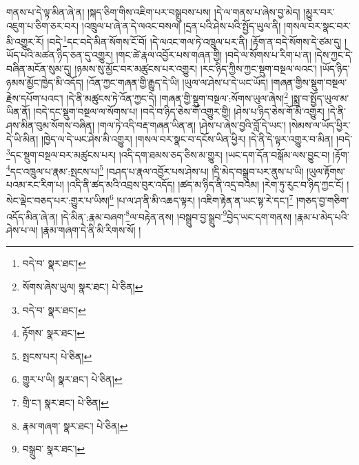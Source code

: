 གནས་པ་དེ་ལྟ་མིན་ཞེ་ན། །སྐད་ཅིག་གིས་འཇིག་པར་བསྒྲུབས་པས། །དེ་ལ་གནས་པ་ཞེས་བྱ་མེད། །མྱུར་བར་འཇུག་པ་ཅིག་ཅར་བར། །འཁྲུལ་པ་ཞེ་ན་དེ་ལའང་བསལ། །དྲན་པའི་ཤེས་པའི་སྤྱོད་ཡུལ་ནི། །གསལ་བར་སྣང་བར་མི་འགྱུར་རོ། །བདེ་\footnote{བདེ་བ་  སྣར་ཐང་། }དང་བདེ་མིན་སོགས་ངོ་བོ། །དེ་ལའང་གལ་ཏེ་འཁྲུལ་པར་ནི། །རྟོག་ན་བདེ་སོགས་དེ་ཙམ་དུ། །ཡོད་པའི་མཚན་ཉིད་ཅན་དུ་འགྱུར། །གང་ཚེ་རྣལ་འབྱོར་པས་གཞན་གྱི། །བདེ་ལ་སོགས་པ་རིག་པ་ན། །དེས་ཀྱང་དེ་བཞིན་མངོན་སུམ་དུ། །ཉམས་སུ་མྱོང་བར་མཚུངས་པར་འགྱུར། །རང་ཉིད་ཀྱིས་ཀྱང་སྡུག་བསྔལ་ལའང་། །ཡོད་ཉིད་ཉམས་མྱོང་ཁྱེད་མི་འདོད། །འོན་ཀྱང་གཞན་གྱི་རྒྱུད་དེ་ཡི། །ཡུལ་ལ་ཤེས་པ་དེ་ཡང་ཡོད། །གཞན་གྱིས་སྡུག་བསྔལ་རྗེས་དཔོག་པའང་། །དེ་ནི་མཚུངས་ཏེ་འོན་ཀྱང་དེ། །གཞན་གྱི་སྡུག་བསྔལ་:སོགས་ཡུལ་ཞེས།\footnote{སོགས་ཞེས་ཡུལ།  སྣར་ཐང་།  པེ་ཅིན། } །སྨྲ་བ་སྤྱོད་ཡུལ་མ་ཡིན་ནོ། །བདེ་དང་སྡུག་བསྔལ་ལ་སོགས་པ། །བདེ་བ་ཉིད་ཅེས་གོ་འགྱུར་གྱི། །ཤེས་པ་ཉིད་ཅེས་གོ་མི་འགྱུར། །དེ་ནི་ཤས་མིན་བུམ་སོགས་བཞིན། །གལ་ཏེ་འདི་བརྡ་གཞན་ཡིན་ན། །ཤེས་པ་ཞེས་བྱའི་བློ་དེ་ཡང་། །སེམས་ལ་ཡོད་ཕྱིར་དེ་ཡི་མིན། །ཁྱེད་ལ་དེ་ཡང་ཤེས་མི་འགྱུར། །གསལ་བར་སྣང་བ་དངོས་ཡིན་ཕྱིར། །དེ་ནི་དེ་ལྟར་འགྱུར་བ་མིན། །བདེ་\footnote{བདེ་བ་  སྣར་ཐང་། }དང་སྡུག་བསྔལ་བར་མཚུངས་པར། །འདི་དག་ཐམས་ཅད་ཅིས་མ་གྱུར། །ཡང་དག་དོན་བསྒོམ་ལས་བྱུང་བ། །རྟོག་\footnote{རྟོགས་  སྣར་ཐང་། }དང་འཁྲུལ་པ་རྣམ་:སྤངས་པ།\footnote{སྤངས་པར།  པེ་ཅིན། } །བཤད་པ་རྣལ་འབྱོར་པས་ཤེས་པ། །དྲི་མེད་བསྒྲུབ་པར་ནུས་པ་ཡི། །ཡུལ་རྟོགས་པའམ་རང་རིག་པ། །འདི་ནི་ཚད་མའི་འབྲས་བུར་འདོད། །ཚད་མ་ཉིད་ནི་འདྲ་བའམ། །རེག་ཏུ་རུང་བ་ཉིད་ཀྱང་ངོ། །སེང་ལྡེང་བཅད་པར་:གྱུར་པ་ཡིས།\footnote{གྱུར་པ་ཡི།  སྣར་ཐང་།  པེ་ཅིན། } །པ་ལ་ཤ་ནི་མི་འཆད་ལྟར། །འཇིག་རྟེན་ན་ཡང་སྟ་རེ་དང་།\footnote{གྲི་ང་།  སྣར་ཐང་།  པེ་ཅིན། } །གཅད་བྱ་གཅིག་འདོད་མིན་ཞེ་ན། །དེ་མིན་:རྣམ་བཞག་\footnote{རྣམ་གཞག་  སྣར་ཐང་།  པེ་ཅིན། }ལ་བརྟེན་ནས། །བསྒྲུབ་བྱ་སྒྲུབ་\footnote{བསྒྲུབ་  སྣར་ཐང་། }བྱེད་ཡང་དག་གནས། །རྣམ་པ་མེད་པའི་ཤེས་པ་ལ། །རྣམ་གཞག་དེ་ནི་མི་རིགས་སོ། །
